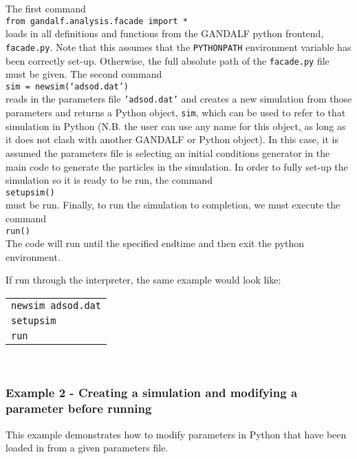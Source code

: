 \documentclass[a4paper]{article}
\newcommand{\var}[1]{\texttt{#1}}
\newcommand{\singlecommand}[1]{\\ \newline \indent \var{#1} \\ \newline \noindent}
\begin{document}



\noindent The first command \singlecommand{from gandalf.analysis.facade import *} loads in all definitions and functions from the GANDALF python frontend, \var{facade.py}.  Note that this assumes that the \var{PYTHONPATH} environment variable has been correctly set-up.  Otherwise, the full absolute path of the \var{facade.py} file must be given.  The second command \singlecommand{sim = newsim(`adsod.dat')} reads in the parameters file \var{'adsod.dat'} and creates a new simulation from those parameters and returns a Python object, \var{sim}, which can be used to refer to that simulation in Python (N.B. the user can use any name for this object, as long as it does not clash with another GANDALF or Python object).  In this case, it is assumed the parameters file is selecting an initial conditions generator in the main code to generate the particles in the simulation.  In order to fully set-up the simulation so it is ready to be run, the command \singlecommand{setupsim()} must be run.  Finally, to run the simulation to completion, we must execute the command \singlecommand{run()}  The code will run until the specified endtime and then exit the python environment.

If run through the interpreter, the same example would look like:\\
\newline
\begin{tabular}{p{14.0cm}}
\var{newsim adsod.dat}            \\
\var{setupsim} \\
\var{run} \\
\end{tabular} \\
\newline




\subsubsection{Example 2 - Creating a simulation and modifying a parameter before running}
This example demonstrates how to modify parameters in Python that have been loaded in from a given parameters file. \\
\end{document}
